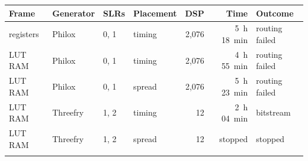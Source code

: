 \begin{tabular}{@{}llllrrl@{}}
\toprule
Frame & Generator & SLRs & Placement & DSP & Time & Outcome \\
\midrule
registers & Philox & 0, 1 & timing & 2{,}076 & 5~h 18~min & routing failed \\
LUT RAM & Philox & 0, 1 & timing & 2{,}076 & 4~h 55~min & routing failed \\
LUT RAM & Philox & 0, 1 & spread & 2{,}076 & 5~h 23~min & routing failed \\
LUT RAM & Threefry & 1, 2 & timing & 12 & 2~h 04~min & bitstream \\
LUT RAM & Threefry & 1, 2 & spread & 12 & stopped & stopped \\
\botrule
\end{tabular}
